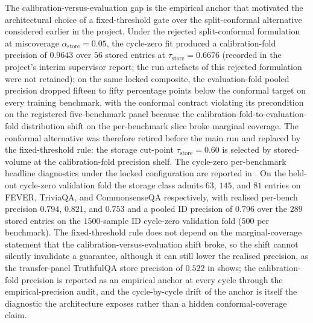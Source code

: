 The calibration-versus-evaluation gap is the empirical anchor that motivated the architectural choice of a fixed-threshold gate over the split-conformal alternative considered earlier in the project. Under the rejected split-conformal formulation at miscoverage $\alpha_{\text{store}} = 0.05$, the cycle-zero fit produced a calibration-fold precision of $0.9643$ over $56$ stored entries at $\tau_{\text{store}} = 0.6676$ (recorded in the project's interim supervisor report; the run artefacts of this rejected formulation were not retained); on the same locked composite, the evaluation-fold pooled precision dropped fifteen to fifty percentage points below the conformal target on every training benchmark, with the conformal contract violating its precondition on the registered five-benchmark panel because the calibration-fold-to-evaluation-fold distribution shift on the per-benchmark slice broke marginal coverage. The conformal alternative was therefore retired before the main run and replaced by the fixed-threshold rule: the storage cut-point $\tau_{\text{store}} = 0.60$ is selected by stored-volume at the calibration-fold precision shelf. The cycle-zero per-benchmark headline diagnostics under the locked configuration are reported in . On the held-out cycle-zero validation fold the storage class admits $63$, $145$, and $81$ entries on FEVER, TriviaQA, and CommonsenseQA respectively, with realised per-bench precision $0.794$, $0.821$, and $0.753$ and a pooled ID precision of $0.796$ over the $289$ stored entries on the $1500$-sample ID cycle-zero validation fold ($500$ per benchmark). The fixed-threshold rule does not depend on the marginal-coverage statement that the calibration-versus-evaluation shift broke, so the shift cannot silently invalidate a guarantee, although it can still lower the realised precision, as the transfer-panel TruthfulQA store precision of $0.522$ in  shows; the calibration-fold precision is reported as an empirical anchor at every cycle through the empirical-precision audit, and the cycle-by-cycle drift of the anchor is itself the diagnostic the architecture exposes rather than a hidden conformal-coverage claim.

